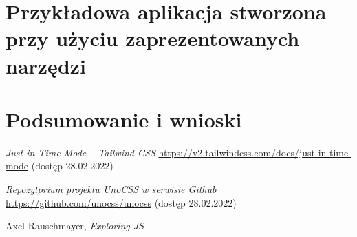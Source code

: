 \documentclass{SGGW-thesis}
\begin{document}
\chapter{Przykładowa aplikacja stworzona przy użyciu zaprezentowanych narzędzi}

\chapter{Podsumowanie i wnioski}


\begin{thebibliography}{9}
\textit{Just-in-Time Mode -- Tailwind CSS}
\url{https://v2.tailwindcss.com/docs/just-in-time-mode} (dostęp 28.02.2022)

\textit{Repozytorium projektu UnoCSS w serwisie Github}
\url{https://github.com/unocss/unocss} (dostęp 28.02.2022)

Axel Rauschmayer, \textit{Exploring JS}

\end{thebibliography}

\beforelastpage
\end{document}
